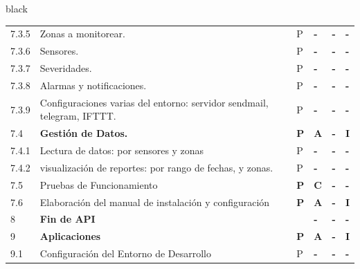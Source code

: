 \documentclass[11pt]{charter}
\begin{document}
\begin{landscape}
\begin{consigna}{black}
\begin{tabularx}{\linewidth}{@{}|p{1.3cm}|p{9.3cm}|p{3cm}|p{3cm}|p{3cm}|p{3cm}|@{}}
7.3.5                  & Zonas a monitorear.                                                                           & P          & \textbf{-} & \textbf{-} & \textbf{-} \\
7.3.6                  & Sensores.                                                                                     & P          & \textbf{-} & \textbf{-} & \textbf{-} \\
7.3.7                  & Severidades.                                                                                  & P          & \textbf{-} & \textbf{-} & \textbf{-} \\
7.3.8                  & Alarmas y notificaciones.                                                                     & P          & \textbf{-} & \textbf{-} & \textbf{-} \\
7.3.9                  & Configuraciones varias del   entorno: servidor sendmail, telegram, IFTTT.                     & P          & \textbf{-} & \textbf{-} & \textbf{-} \\
7.4                    & \textbf{Gestión de Datos.}                                                                    & \textbf{P} & \textbf{A} & \textbf{-} & \textbf{I} \\
7.4.1                  & Lectura de datos: por sensores y   zonas                                                      & P          & \textbf{-} & \textbf{-} & \textbf{-} \\
7.4.2                  & visualización de reportes: por   rango de fechas,  y zonas.                                   & P          & \textbf{-} & \textbf{-} & \textbf{-} \\
7.5                    & Pruebas de Funcionamiento                                                                     & \textbf{P} & \textbf{C} & \textbf{-} & \textbf{-} \\
7.6                    & Elaboración del manual de   instalación y configuración                                       & \textbf{P} & \textbf{A} & \textbf{-} & \textbf{I} \\
8                      & \textbf{Fin de API}                                                                           &            & \textbf{-} & \textbf{-} & \textbf{-} \\
9                      & \textbf{Aplicaciones}                                                                         & \textbf{P} & \textbf{A} & \textbf{-} & \textbf{I} \\
9.1                    & Configuración del Entorno de   Desarrollo                                                     & P          & \textbf{-} & \textbf{-} & \textbf{-} \\

\end{tabularx}
\end{consigna}
\end{landscape}
\end{document}
